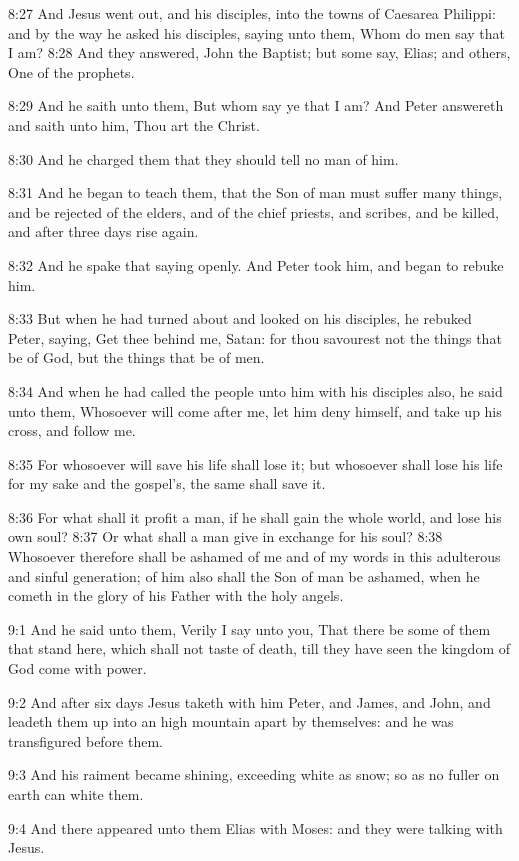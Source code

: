 8:27 And Jesus went out, and his disciples, into the towns of Caesarea
Philippi: and by the way he asked his disciples, saying unto them,
Whom do men say that I am?  8:28 And they answered, John the Baptist;
but some say, Elias; and others, One of the prophets.

8:29 And he saith unto them, But whom say ye that I am? And Peter
answereth and saith unto him, Thou art the Christ.

8:30 And he charged them that they should tell no man of him.

8:31 And he began to teach them, that the Son of man must suffer many
things, and be rejected of the elders, and of the chief priests, and
scribes, and be killed, and after three days rise again.

8:32 And he spake that saying openly. And Peter took him, and began to
rebuke him.

8:33 But when he had turned about and looked on his disciples, he
rebuked Peter, saying, Get thee behind me, Satan: for thou savourest
not the things that be of God, but the things that be of men.

8:34 And when he had called the people unto him with his disciples
also, he said unto them, Whosoever will come after me, let him deny
himself, and take up his cross, and follow me.

8:35 For whosoever will save his life shall lose it; but whosoever
shall lose his life for my sake and the gospel's, the same shall save
it.

8:36 For what shall it profit a man, if he shall gain the whole world,
and lose his own soul?  8:37 Or what shall a man give in exchange for
his soul?  8:38 Whosoever therefore shall be ashamed of me and of my
words in this adulterous and sinful generation; of him also shall the
Son of man be ashamed, when he cometh in the glory of his Father with
the holy angels.

9:1 And he said unto them, Verily I say unto you, That there be some
of them that stand here, which shall not taste of death, till they
have seen the kingdom of God come with power.

9:2 And after six days Jesus taketh with him Peter, and James, and
John, and leadeth them up into an high mountain apart by themselves:
and he was transfigured before them.

9:3 And his raiment became shining, exceeding white as snow; so as no
fuller on earth can white them.

9:4 And there appeared unto them Elias with Moses: and they were
talking with Jesus.

